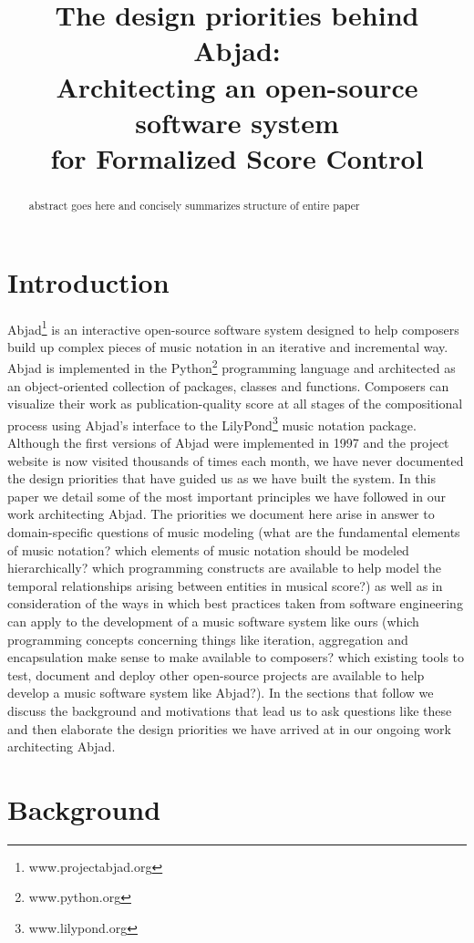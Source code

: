 \documentclass{article}
\title{The design priorities behind Abjad: \\
Architecting an open-source software system \\
for Formalized Score Control}
\begin{document}
\capstartfalse
\maketitle
\capstarttrue

\begin{abstract}
abstract goes here and concisely summarizes structure of entire paper
\end{abstract}

\section{Introduction} \label{sec:background}
Abjad\footnote{www.projectabjad.org} is an interactive open-source software
system designed to help composers build up complex pieces of music notation in
an iterative and incremental way.  Abjad is implemented in the
Python\footnote{www.python.org} programming language and architected as an
object-oriented collection of packages, classes and functions. Composers can
visualize their work as publication-quality score at all stages of the
compositional process using Abjad's interface to the
LilyPond\footnote{www.lilypond.org} music notation package. Although the first
versions of Abjad were implemented in 1997 and the project website is now
visited thousands of times each month, we have never documented the design
priorities that have guided us as we have built the system. In this paper we
detail some of the most important principles we have followed in our work
architecting Abjad. The priorities we document here arise in answer to
domain-specific questions of music modeling (what are the fundamental elements
of music notation? which elements of music notation should be modeled
hierarchically? which programming constructs are available to help model the
temporal relationships arising between entities in musical score?) as well as
in consideration of the ways in which best practices taken from software
engineering can apply to the development of a music software system like ours
(which programming concepts concerning things like iteration, aggregation and
encapsulation make sense to make available to composers? which existing tools
to test, document and deploy other open-source projects are available to help
develop a music software system like Abjad?). In the sections that follow we
discuss the background and motivations that lead us to ask questions like these
and then elaborate the design priorities we have arrived at in our ongoing work
architecting Abjad.
\section{Background} \label{sec:background}
\end{document}
